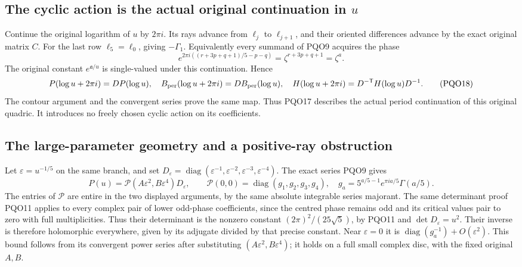 \documentclass[11pt,a4paper]{article}
\begin{document}
\subsection{The cyclic action is the actual original continuation in $u$}
Continue the original logarithm of $u$ by $2\pi i$. Its rays
advance from $\ell_j$ to $\ell_{j+1}$, and their oriented
differences advance by the exact original matrix $C$.
For the last row $\ell_5=\ell_0$, giving $-\Gamma_1$.
Equivalently every summand of PQO9 acquires the phase
\[
 e^{2\pi i((r+3p+q+1)/5-p-q)}
       =\zeta^{r+3p+q+1}=\zeta^a.
\]
The original constant $e^{\mathfrak a/u}$ is single-valued
under this continuation. Hence
\[
 P(\log u+2\pi i)=DP(\log u),\quad
 B_{\rm per}(\log u+2\pi i)=DB_{\rm per}(\log u),\quad
 H(\log u+2\pi i)=D^{-\mathsf T}H(\log u)D^{-1}.
 \tag{PQO18}
\]
The contour argument and the convergent series prove the same
map. Thus PQO17 describes the actual period continuation of
this original quadric. It introduces no freely chosen cyclic
action on its coefficients.

\subsection{The large-parameter geometry and a positive-ray obstruction}
Let $\varepsilon=u^{-1/5}$ on the same branch, and set
$D_\varepsilon=\operatorname{diag}(\varepsilon^{-1},
\varepsilon^{-2},\varepsilon^{-3},\varepsilon^{-4})$.
The exact series PQO9 gives
\[
 P(u)=\mathscr P(A\varepsilon^2,B\varepsilon^4)D_\varepsilon,
 \qquad
 \mathscr P(0,0)=\operatorname{diag}(g_1,g_2,g_3,g_4),
 \quad g_a=5^{a/5-1}e^{\pi ia/5}\Gamma(a/5).
 \tag{PQO19}
\]
The entries of $\mathscr P$ are entire in the two displayed
arguments, by the same absolute integrable series majorant.
The same determinant proof PQO11 applies to every complex pair
of lower odd-phase coefficients, since the centred phase remains
odd and its critical values pair to zero with full multiplicities.
Thus their determinant is the nonzero constant
$(2\pi)^2/(25\sqrt5)$, by PQO11 and $\det D_\varepsilon=u^2$.
Their inverse is therefore holomorphic everywhere, given by its
adjugate divided by that precise constant. Near $\varepsilon=0$
it is $\operatorname{diag}(g_a^{-1})+O(\varepsilon^2)$.
This bound follows from its convergent power series after
substituting $(A\varepsilon^2,B\varepsilon^4)$; it holds on
a full small complex disc, with the fixed original $A,B$.
\end{document}
